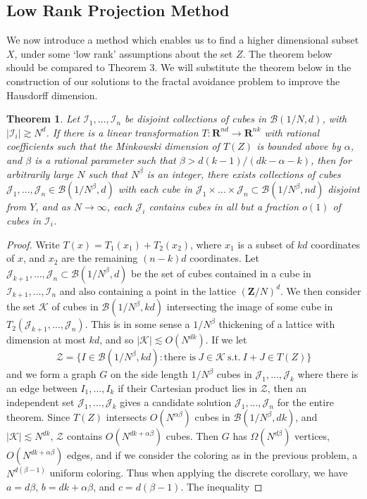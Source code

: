 \documentclass{article}
\theoremstyle{plain}
\theoremstyle{plain}
\newtheorem{theorem}{Theorem}
\begin{document}
\begin{multicols}{2}
\section{Low Rank Projection Method}

We now introduce a method which enables us to find a higher dimensional subset $X$, under some `low rank' assumptions about the set $Z$. The theorem below should be compared to Theorem 3. We will substitute the theorem below in the construction of our solutions to the fractal avoidance problem to improve the Hausdorff dimension.

\begin{theorem}
	Let $\mathcal{I}_1, \dots, \mathcal{I}_n$ be disjoint collections of cubes in $\mathcal{B}(1/N,d)$, with $|\mathcal{I}_i| \gtrsim N^d$. If there is a linear transformation $T: \mathbf{R}^{nd} \to \mathbf{R}^{nk}$ with rational coefficients such that the Minkowski dimension of $T(Z)$ is bounded above by $\alpha$, and $\beta$ is a rational parameter such that $\beta > d(k-1)/(dk - \alpha - k)$, then for arbitrarily large $N$ such that $N^\beta$ is an integer, there exists collections of cubes $\mathcal{J}_1, \dots, \mathcal{J}_n \in \mathcal{B}(1/N^\beta,d)$ with each cube in $\mathcal{J}_1 \times \dots \times \mathcal{J}_n \subset \mathcal{B}(1/N^\beta,nd)$ disjoint from $Y$, and as $N \to \infty$, each $\mathcal{J}_i$ contains cubes in all but a fraction $o(1)$ of cubes in $\mathcal{I}_i$.
\end{theorem}
\begin{proof}
	Write $T(x) = T_1(x_1) + T_2(x_2)$, where $x_1$ is a subset of $kd$ coordinates of $x$, and $x_2$ are the remaining $(n-k)d$ coordinates. Let $\mathcal{J}_{k+1}, \dots, \mathcal{J}_n \subset \mathcal{B}(1/N^\beta,d)$ be the set of cubes contained in a cube in $\mathcal{I}_{k+1}, \dots, \mathcal{I}_n$ and also containing a point in the lattice $(\mathbf{Z}/N)^d$. We then consider the set $\mathcal{K}$ of cubes in $\mathcal{B}(1/N^\beta,kd)$ intersecting the image of some cube in $T_2(\mathcal{J}_{k+1}, \dots, \mathcal{J}_n)$. This is in some sense a $1/N^\beta$ thickening of a lattice with dimension at most $kd$, and so $|\mathcal{K}| \lesssim O(N^{dk})$. If we let
	\[ \mathcal{Z} = \{ I \in \mathcal{B}(1/N^\beta,kd): \text{there is}\ J \in \mathcal{K}\ \text{s.t.}\ I + J \in T(Z) \} \]
	and we form a graph $G$ on the side length $1/N^\beta$ cubes in $\mathcal{J}_1, \dots, \mathcal{J}_k$ where there is an edge between $I_1, \dots, I_k$ if their Cartesian product lies in $\mathcal{Z}$, then an independent set $\mathcal{J}_1, \dots, \mathcal{J}_k$ gives a candidate solution $\mathcal{J}_1, \dots, \mathcal{J}_n$ for the entire theorem. Since $T(Z)$ intersects $O(N^{\alpha \beta})$ cubes in $\mathcal{B}(1/N^\beta,dk)$, and $|\mathcal{K}| \lesssim N^{dk}$, $\mathcal{Z}$ contains $O(N^{dk + \alpha \beta})$ cubes. Then $G$ has $\Omega(N^{d \beta})$ vertices, $O(N^{dk + \alpha \beta})$ edges, and if we consider the coloring as in the previous problem, a $N^{d(\beta - 1)}$ uniform coloring. Thus when applying the discrete corollary, we have $a = d \beta$, $b = dk + \alpha \beta$, and $c = d(\beta - 1)$. The inequality

\end{proof}
\end{multicols}
\end{document}
